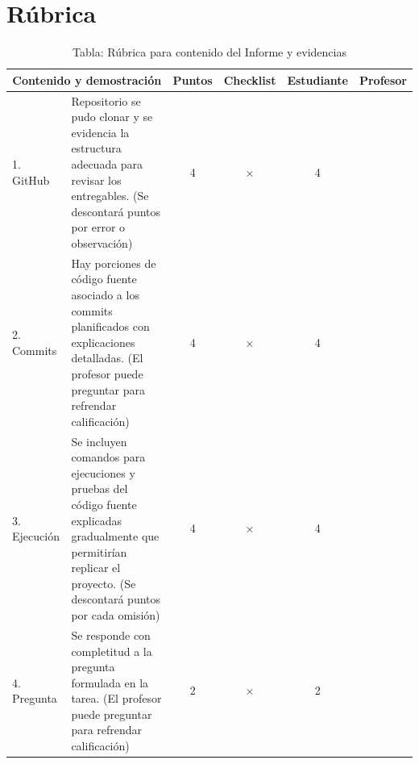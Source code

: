 \documentclass{article}
\begin{document}
\section{Rúbrica}
\begin{table}[H]
	\centering
	\caption{Tabla: Rúbrica para contenido del Informe y evidencias}
	\begin{tabular}{|p{2cm}|p{6cm}|c|c|c|c|}
		\hline
		\multicolumn{2}{|c|}{\textbf{Contenido y demostración}} & \textbf{Puntos}                                                                                                                                                                                                                                                                  & \textbf{Checklist} & \textbf{Estudiante} & \textbf{Profesor}   \\ \hline
		1. GitHub                                               & Repositorio se pudo clonar y se evidencia la estructura adecuada para revisar los entregables. (Se descontará puntos por error o observación)                                                                                                                                    & 4                  & ×                   & 4                 & \\ \hline
		2. Commits                                              & Hay porciones de código fuente asociado a los commits planificados con explicaciones detalladas. (El profesor puede preguntar para refrendar calificación)                                                                                                                       & 4                  & ×                   & 4                 & \\ \hline
		3. Ejecución                                            & Se incluyen comandos para ejecuciones y pruebas del código fuente explicadas gradualmente que permitirían replicar el proyecto. (Se descontará puntos por cada omisión)                                                                                                          & 4                  & ×                   & 4                 & \\ \hline
		4. Pregunta                                             & Se responde con completitud a la pregunta formulada en la tarea. (El profesor puede preguntar para refrendar calificación)                                                                                                                                                       & 2                  & ×                   & 2                 & \\ \hline

\end{tabular}
\end{table}
\end{document}
